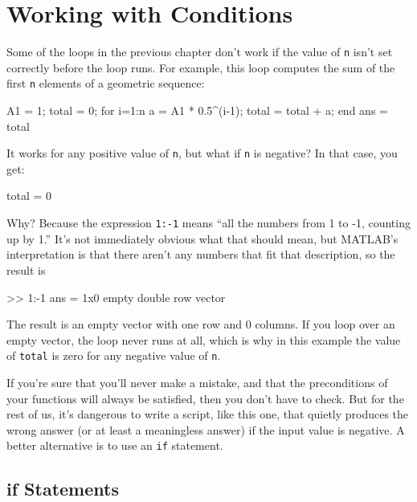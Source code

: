 \section{Working with Conditions}


Some of the loops in the previous chapter don't work
if the value of {\tt n} isn't set correctly before the loop runs.
For example, this loop computes the sum of the first {\tt n} elements
of a geometric sequence:

\begin{code}
A1 = 1;
total = 0;
for i=1:n
    a = A1 * 0.5^(i-1);
    total = total + a;
end
ans = total
\end{code}

It works for any positive value of {\tt n}, but what if {\tt n}
is negative?  In that case, you get:

\begin{code}
total = 0
\end{code}

Why?  Because the expression {\tt 1:-1} means ``all the numbers
from 1 to -1, counting up by 1.''  
It's not immediately obvious
what that should mean, but MATLAB's interpretation is that there
aren't any numbers that fit that description, so the result is


\begin{code}
>> 1:-1
ans = 1x0 empty double row vector
\end{code}

The result is an empty vector with one row and 0 columns.
If you loop over an empty vector,
the loop never runs at all, which is why in this example the
value of {\tt total} is zero for any negative value of {\tt n}.

If you're sure that you'll never make a mistake, and that the
preconditions of your functions will always be satisfied, then you
don't have to check.  But for the rest of us, it's dangerous to write
a script, like this one, that quietly produces the wrong answer (or
at least a meaningless answer) if the input value is negative.
A better alternative is to use an {\tt if} statement.

\subsection{if Statements}

